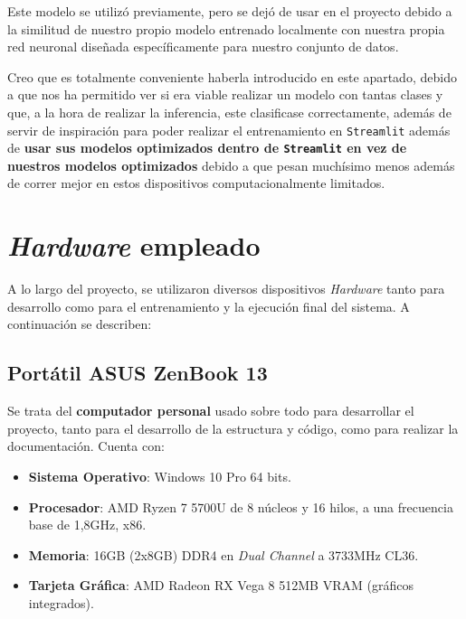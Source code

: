 Este modelo se utilizó previamente, pero se dejó de usar en el proyecto debido a la similitud de nuestro propio modelo entrenado localmente con nuestra propia red neuronal diseñada específicamente para nuestro conjunto de datos. 

Creo que es totalmente conveniente haberla introducido en este apartado, debido a que nos ha permitido ver si era viable realizar un modelo con tantas clases y que, a la hora de realizar la inferencia, este clasificase correctamente, además de servir de inspiración para poder realizar el entrenamiento en \texttt{Streamlit} además de \textbf{usar sus modelos optimizados dentro de \texttt{Streamlit} en vez de nuestros modelos optimizados} debido a que pesan muchísimo menos además de correr mejor en estos dispositivos computacionalmente limitados.



\section{\textit{Hardware} empleado}\label{hardare-empleado}
A lo largo del proyecto, se utilizaron diversos dispositivos \textit{Hardware} tanto para desarrollo como para el entrenamiento y la ejecución final del sistema. A continuación se describen:
\newline
\subsection{Portátil ASUS ZenBook 13}



Se trata del \textbf{computador personal} usado sobre todo para desarrollar el proyecto, tanto para el desarrollo de la estructura y código, como para realizar la documentación. Cuenta con:

\begin{itemize}
\tightlist
    \item \textbf{Sistema Operativo}: Windows 10 Pro 64 bits.
    \item \textbf{Procesador}: AMD Ryzen 7 5700U de 8 núcleos y 16 hilos, a una frecuencia base de 1,8GHz, x86.
    \item \textbf{Memoria}: 16GB (2x8GB) DDR4 en \textit{Dual Channel} a 3733MHz CL36.
    \item \textbf{Tarjeta Gráfica}: AMD Radeon RX Vega 8 512MB VRAM (gráficos integrados). 
\end{itemize}

